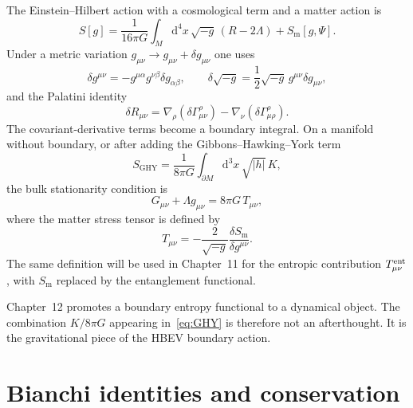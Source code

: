 The Einstein--Hilbert action with a cosmological term and a matter
action is
\begin{equation}
  \label{eq:EH-full}
  S[g]
  =\frac{1}{16\pi G}\int_M\mathrm{d}^4x\,\sqrt{-g}\,(R-2\Lambda)
   +S_{\mathrm{m}}[g,\Psi].
\end{equation}
Under a metric variation \(g_{\mu\nu}\to g_{\mu\nu}+\delta g_{\mu\nu}\)
one uses
\begin{equation}
  \label{eq:var-identities}
  \delta g^{\mu\nu}=-g^{\mu\alpha}g^{\nu\beta}\delta g_{\alpha\beta},\qquad
  \delta\sqrt{-g}=\frac12\sqrt{-g}\,g^{\mu\nu}\delta g_{\mu\nu},
\end{equation}
and the Palatini identity
\begin{equation}
  \label{eq:palatini}
  \delta R_{\mu\nu}
  =\nabla_\rho(\delta\Gamma^\rho_{\mu\nu})
   -\nabla_\nu(\delta\Gamma^\rho_{\mu\rho}).
\end{equation}
The covariant-derivative terms become a boundary integral. On a
manifold without boundary, or after adding the Gibbons--Hawking--York
term
\begin{equation}
  \label{eq:GHY}
  S_{\mathrm{GHY}}
  =\frac{1}{8\pi G}\int_{\partial M}\mathrm{d}^3x\,\sqrt{|h|}\,K,
\end{equation}
the bulk stationarity condition is
\begin{equation}
  \label{eq:EFE}
  G_{\mu\nu}+\Lambda g_{\mu\nu}=8\pi G\,T_{\mu\nu},
\end{equation}
where the matter stress tensor is defined by
\begin{equation}
  \label{eq:T-def}
  T_{\mu\nu}
  =-\frac{2}{\sqrt{-g}}
    \frac{\delta S_{\mathrm{m}}}{\delta g^{\mu\nu}}.
\end{equation}
The same definition will be used in Chapter~11 for the entropic
contribution \(T^{\mathrm{ent}}_{\mu\nu}\), with \(S_{\mathrm{m}}\) replaced by
the entanglement functional.

\begin{remark}
  Chapter~12 promotes a boundary entropy functional to a dynamical
  object. The combination \(K/8\pi G\) appearing in~\eqref{eq:GHY} is
  therefore not an afterthought. It is the gravitational piece of the
  HBEV boundary action.
\end{remark}

\section{Bianchi identities and conservation}
\label{sec:ch2-bianchi}

